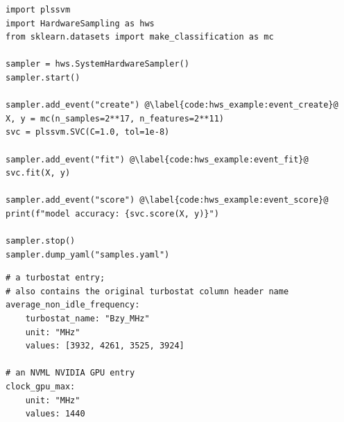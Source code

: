 % 




\begin{listing}
    \begin{verbatim}
import plssvm
import HardwareSampling as hws
from sklearn.datasets import make_classification as mc

sampler = hws.SystemHardwareSampler()
sampler.start()

sampler.add_event("create") @\label{code:hws_example:event_create}@
X, y = mc(n_samples=2**17, n_features=2**11)
svc = plssvm.SVC(C=1.0, tol=1e-8)

sampler.add_event("fit") @\label{code:hws_example:event_fit}@
svc.fit(X, y)

sampler.add_event("score") @\label{code:hws_example:event_score}@
print(f"model accuracy: {svc.score(X, y)}")

sampler.stop()
sampler.dump_yaml("samples.yaml")
    \end{verbatim}
    \caption{%
    A code example showing the simplicity of the hws library. 
    With only five required lines of code, it is possible to gather information from the whole system during the classification task.%
    Additionally, events can be added to make the final output easier to understand and post-process (see lines \ref{code:hws_example:event_create}, \ref{code:hws_example:event_fit}, and \ref{code:hws_example:event_score}).
    }
    \label{code:hws_example}
\end{listing}

\begin{listing}
    \begin{verbatim}
# a turbostat entry;
# also contains the original turbostat column header name
average_non_idle_frequency:
    turbostat_name: "Bzy_MHz"
    unit: "MHz"
    values: [3932, 4261, 3525, 3924]

# an NVML NVIDIA GPU entry
clock_gpu_max:
    unit: "MHz"
    values: 1440
    \end{verbatim}
    \caption{%
    Explanatory YAML entries.%
    Note that the comments are not output in the YAML file but are only added to this example as a means for easier explanation. 
    }
    \label{code:hws_yaml}
\end{listing}

